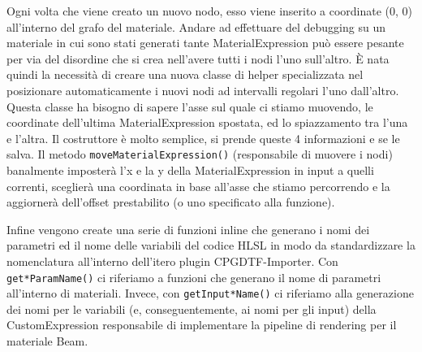 \documentclass[main.tex]{subfiles}
\begin{document}
Ogni volta che viene creato un nuovo nodo, esso viene inserito a coordinate (0, 0) all'interno del grafo del materiale. Andare ad effettuare del debugging su un materiale in cui sono stati generati tante MaterialExpression può essere pesante per via del disordine che si crea nell'avere tutti i nodi l'uno sull'altro. È nata quindi la necessità di creare una nuova classe di helper specializzata nel posizionare automaticamente i nuovi nodi ad intervalli regolari l'uno dall'altro. \newline
Questa classe ha bisogno di sapere l'asse sul quale ci stiamo muovendo, le coordinate dell'ultima MaterialExpression spostata, ed lo spiazzamento tra l'una e l'altra. Il costruttore è molto semplice, si prende queste 4 informazioni e se le salva. Il metodo \lstinline{moveMaterialExpression()} (responsabile di muovere i nodi) banalmente imposterà l'x e la y della MaterialExpression in input a quelli correnti, sceglierà una coordinata in base all'asse che stiamo percorrendo e la aggiornerà dell'offset prestabilito (o uno specificato alla funzione).
\clearpage %
%
%
%
%

Infine vengono create una serie di funzioni inline che generano i nomi dei parametri ed il nome delle variabili del codice HLSL in modo da standardizzare la nomenclatura all'interno dell'itero plugin CPGDTF-Importer. Con \lstinline{get*ParamName()} ci riferiamo a funzioni che generano il nome di parametri all'interno di materiali. Invece, con \lstinline{getInput*Name()} ci riferiamo alla generazione dei nomi per le variabili (e, conseguentemente, ai nomi per gli input) della CustomExpression responsabile di implementare la pipeline di rendering per il materiale Beam.
\end{document}
